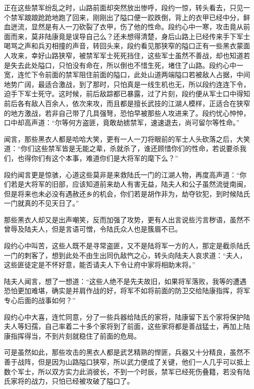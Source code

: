 正在这些禁军纷乱之时，山路前面却突然放出惨呼，段约一惊，转头看去，只见一个禁军踉踉跄跄地跑了回来，刚刚出了隘口便一跤跌倒，背上的衣甲已经中分，鲜血迸流，显然是有人一刀砍裂了衣甲，伤了他的性命。段约心中一寒，攻击竟从前面而来，莫非陆康竟是误导自己么？还未想得清楚，身后山路上已经传来手下军士喝骂之声和兵刃相撞的声音，转回头来，段约看见那狭窄的隘口正有一些黑衣蒙面人攻来，幸好山路狭窄，被禁军军士死死挡住，这些军士虽然不善战，却也知道若是失去此处隘口，只怕没有命在，所以倒也不惜生死，堵住了山路。段约心中一宽，连忙下令前面的禁军阻住前面的隘口，此处山道两端隘口若被敌人占据，中间地势广阔，最适合激战，到了那时，只怕真是一线生机也无，所以段约连连下令，迫手下军士死守。这时候，前后敌踪都已暴露，过了片刻，段约便从军士口中得知前后各有敌人百余人，依次来攻，而且都是擅长武技的江湖人模样，正适合在狭窄的地方激战，若非自己带了几具强弩，恐怕早被那些人攻进来了。段约忧心忡忡，口中却高声道：“尔等何方盗匪，竟敢劫掳禁军，速速退去，尚可留尔等性命。”

闻言，那些黑衣人都是哈哈大笑，更有一人一刀将眼前的军士人头砍落之后，大笑道：“你们这些禁军皆是无能之辈，杀就杀了，谁还顾惜你们的性命，若说要杀我们，也得你们有这个本事，难道你们是大将军的麾下么？”

段约闻言更是惊骇，心道这些莫非是来救陆氏一门的江湖人物，再度高声道：“你们若是大将军的旧部，应该知道前来劫人有害无益，陆夫人和公子虽然流徙南闽，但是将来也未必没有遇赦还乡的机会，你们若是胡作非为，劫夺钦犯，到时候陆氏一门就真的不见天日了。”

那些黑衣人却又是出声嘲笑，反而加强了攻势，更有人出言说些污言秽语，虽然不曾辱及陆夫人，但是言语可憎，令陆氏众人也是簇眉不已。

段约心中叫苦，这些人既不是寻常盗匪，又不是陆将军一方的人，那定是截杀陆氏一门的刺客了，想到此处不由生出同仇敌忾之心，转头向陆夫人哀求道：“夫人，这些匪徒定是不怀好意，能否请夫人下令让府中家将相助末将。”

陆夫人闻言，想了一想道：“这些人绝不是先夫故旧，如果将军落败，我等的遭遇恐怕更加难堪，确实是并肩作战的好，将军不如将前面的防卫交给陆康指挥，将军专心后面的战事如何？”

段约心中大喜，连忙同意，分了一些兵器给陆氏的家将，陆康留下五个家将保护陆夫人等妇孺，自己率着二十多个家将到了前面，这些家将都是善战猛士，再加上陆康指挥得当，不到片刻就稳住了前面的危局。

可是虽然如此，那些攻击的黑衣人都是武艺精熟的悍匪，兵器又十分精良，虽然不善于战阵，但是因为山路隘口狭窄，所以武力便成了关键，他们一人几乎可以抵上数个军士，所以双方实力此消彼长，不到一个时辰，禁军已经死伤叠籍，若没有陆氏家将的战力，只怕已经被攻破了隘口了。

